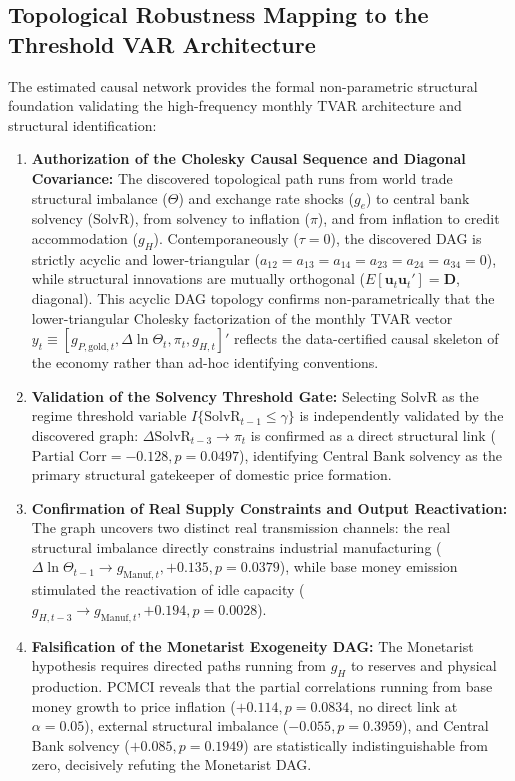 \subsection{Topological Robustness Mapping to the Threshold VAR Architecture}
\label{app:pcmci_tvar_mapping}

The estimated causal network provides the formal non-parametric structural foundation validating the high-frequency monthly TVAR architecture and structural identification:
\begin{enumerate}[leftmargin=2em]
	\item \textbf{Authorization of the Cholesky Causal Sequence and Diagonal Covariance:} The discovered topological path runs from world trade structural imbalance ($\Theta$) and exchange rate shocks ($g_e$) to central bank solvency ($\text{SolvR}$), from solvency to inflation ($\pi$), and from inflation to credit accommodation ($g_H$). Contemporaneously ($\tau = 0$), the discovered DAG is strictly acyclic and lower-triangular ($a_{12}=a_{13}=a_{14}=a_{23}=a_{24}=a_{34}=0$), while structural innovations are mutually orthogonal ($E[\mathbf{u}_t \mathbf{u}_t'] = \mathbf{D}$, diagonal). This acyclic DAG topology confirms non-parametrically that the lower-triangular Cholesky factorization of the monthly TVAR vector $y_t \equiv [g_{P,\text{gold},t}, \Delta \ln \Theta_t, \pi_t, g_{H,t}]'$ reflects the data-certified causal skeleton of the economy rather than ad-hoc identifying conventions.
	\item \textbf{Validation of the Solvency Threshold Gate:} Selecting $\text{SolvR}$ as the regime threshold variable $I\{\text{SolvR}_{t-1} \le \gamma\}$ is independently validated by the discovered graph: $\Delta \text{SolvR}_{t-3} \to \pi_t$ is confirmed as a direct structural link ($\text{Partial Corr} = -0.128, p = 0.0497$), identifying Central Bank solvency as the primary structural gatekeeper of domestic price formation.
	\item \textbf{Confirmation of Real Supply Constraints and Output Reactivation:} The graph uncovers two distinct real transmission channels: the real structural imbalance directly constrains industrial manufacturing ($\Delta \ln \Theta_{t-1} \to g_{\text{Manuf},t}, +0.135, p = 0.0379$), while base money emission stimulated the reactivation of idle capacity ($g_{H,t-3} \to g_{\text{Manuf},t}, +0.194, p = 0.0028$).
	\item \textbf{Falsification of the Monetarist Exogeneity DAG:} The Monetarist hypothesis requires directed paths running from $g_H$ to reserves and physical production. PCMCI reveals that the partial correlations running from base money growth to price inflation ($+0.114, p = 0.0834$, no direct link at $\alpha=0.05$), external structural imbalance ($-0.055, p = 0.3959$), and Central Bank solvency ($+0.085, p = 0.1949$) are statistically indistinguishable from zero, decisively refuting the Monetarist DAG.

\end{enumerate}
